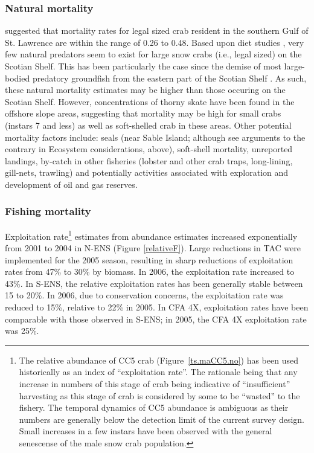 \documentclass[11pt]{article}
\begin{document}
\subsubsection{Natural mortality}

\citet{Wade2003} suggested that mortality rates for legal sized crab resident in the southern Gulf of St. Lawrence are within the range of 0.26 to 0.48. Based upon diet studies \citep{Bundy2004}, very few natural predators seem to exist for large snow crabs (i.e., legal sized) on the Scotian Shelf. This has been particularly the case since the demise of most large-bodied predatory groundfish from the eastern part of the Scotian Shelf \citep{Choi2004}. As such, these natural mortality estimates may be higher than those occuring on the Scotian Shelf. However, concentrations of thorny skate have been found in the offshore slope areas, suggesting that mortality may be high for small crabs (instars 7 and less) as well as soft-shelled crab in these areas. Other potential mortality factors include: seals (near Sable Island; although see arguments to the contrary in Ecosystem considerations, above), soft-shell mortality, unreported landings, by-catch in other fisheries (lobster and other crab traps, long-lining, gill-nets, trawling) and potentially activities associated with exploration and development of oil and gas reserves.


\subsubsection{Fishing mortality}


Exploitation rate\footnote{The relative abundance of CC5 crab (Figure~\ref{ts.maCC5.no}) has been used historically as an index of ``exploitation rate''. The rationale being that any increase in numbers of this stage of crab being indicative of ``insufficient'' harvesting as this stage of crab is considered by some to be ``wasted'' to the fishery. The temporal dynamics of CC5 abundance is ambiguous as their numbers are generally below the detection limit of the current survey design. Small increases in a few instars have been observed with the general senescense of the male snow crab population.} estimates from abundance estimates increased exponentially from 2001 to 2004 in N-ENS (Figure \ref{relativeF}). Large reductions in TAC were implemented for the 2005 season, resulting in sharp reductions of exploitation rates from 47\% to 30\% by biomass. In 2006, the exploitation rate increased to 43\%. In S-ENS, the relative exploitation rates has been generally stable between 15 to 20\%. In 2006, due to conservation concerns, the exploitation rate was reduced to 15\%, relative to 22\% in 2005. In CFA 4X, exploitation rates have been comparable with those observed in S-ENS; in 2005, the CFA 4X exploitation rate was 25\%.
\end{document}
